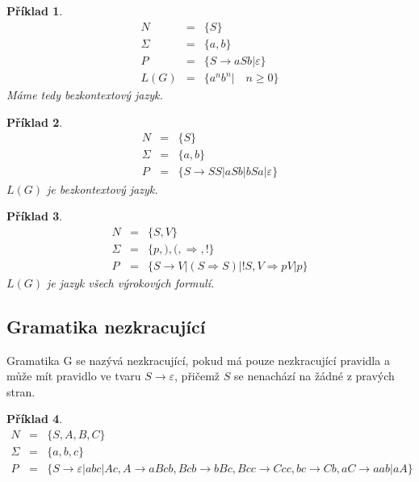 \documentclass[10pt, a4paper, titlepage]{article}
\theoremstyle{note}
\newtheorem{priklad}{\textbf{Příklad}}
\begin{document}
\vspace{30px}

\begin{priklad}
\begin{eqnarray*}
N &=& \lbrace S \rbrace \\
\Sigma &=& \lbrace a, b \rbrace \\
P &=& \lbrace S \rightarrow aSb | \varepsilon \rbrace \\
L(G) &=& \lbrace a^{n}b^{n} | \quad n \geq 0 \rbrace
\end{eqnarray*}
Máme tedy \emph{bezkontextový} jazyk.
\end{priklad}

\begin{priklad}
\begin{eqnarray*}
N &=& \lbrace S \rbrace \\
\Sigma &=& \lbrace a, b \rbrace \\
P &=& \lbrace S \rightarrow SS|aSb|bSa| \varepsilon \rbrace
\end{eqnarray*}
$L(G)$ je \emph{bezkontextový} jazyk.
\end{priklad}

\begin{priklad}
\begin{eqnarray*}
N &=& \lbrace S, V \rbrace \\
\Sigma &=& \lbrace p,),(, \Rightarrow, ! \rbrace \\
P &=& \lbrace S \rightarrow V|(S \Rightarrow S)|!S, V \Rightarrow pV|p \rbrace
\end{eqnarray*}
$L(G)$ je jazyk všech výrokových formulí.
\end{priklad}



\subsection{Gramatika nezkracující}
Gramatika G se nazývá nezkracující, pokud má pouze nezkracující pravidla a může mít pravidlo ve tvaru $S \rightarrow \varepsilon$, přičemž $S$ se nenachází na žádné z pravých stran.

\begin{priklad}
\begin{eqnarray*}
N &=& \lbrace S, A, B, C\rbrace \\
\Sigma &=& \lbrace a, b, c\rbrace \\
P &=& \lbrace S \rightarrow \varepsilon |abc|Ac, A \rightarrow aBcb, Bcb \rightarrow bBc, Bcc \rightarrow Ccc, bc \rightarrow Cb, aC \rightarrow aab|aA \rbrace
\end{eqnarray*}
\end{priklad}
\end{document}
